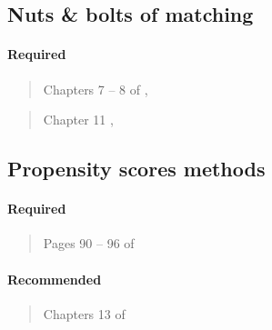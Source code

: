 \documentclass[12pt]{article}
\begin{document}
\subsection{Nuts \& bolts of matching}

\paragraph*{Required}

\begin{verse}
  Chapters 7 -- 8 of , 
\end{verse}

\begin{verse}
  Chapter 11 , 
\end{verse}

\subsection{Propensity scores methods}

\paragraph*{Required}

\begin{verse} Pages 90 -- 96 of  \end{verse}

\begin{verse}
\end{verse}

\paragraph*{Recommended}

\begin{verse}
\end{verse}

\begin{verse}
\end{verse}

\begin{verse}
\end{verse}

\begin{verse}
  Chapters 13 of 
\end{verse}

\begin{verse}
\end{verse}
\end{document}
